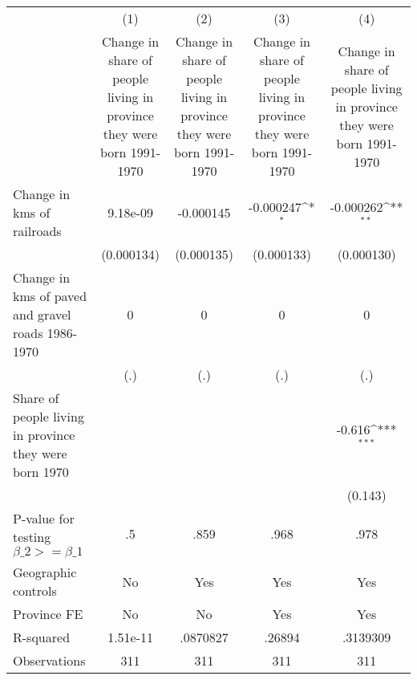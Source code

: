 {
\def\sym#1{\ifmmode^{#1}\else\(^{#1}\)\fi}
\begin{tabular}{l*{4}{c}}
\hline\hline
                &\multicolumn{1}{c}{(1)}&\multicolumn{1}{c}{(2)}&\multicolumn{1}{c}{(3)}&\multicolumn{1}{c}{(4)}\\
                &\multicolumn{1}{c}{Change in share of people living in province they were born 1991-1970}&\multicolumn{1}{c}{Change in share of people living in province they were born 1991-1970}&\multicolumn{1}{c}{Change in share of people living in province they were born 1991-1970}&\multicolumn{1}{c}{Change in share of people living in province they were born 1991-1970}\\
\hline
Change in kms of railroads& 9.18e-09         &-0.000145         &-0.000247\sym{*}  &-0.000262\sym{**} \\
                &(0.000134)         &(0.000135)         &(0.000133)         &(0.000130)         \\
[1em]
Change in kms of paved and gravel roads 1986-1970&        0         &        0         &        0         &        0         \\
                &      (.)         &      (.)         &      (.)         &      (.)         \\
[1em]
Share of people living in province they were born 1970&                  &                  &                  &   -0.616\sym{***}\\
                &                  &                  &                  &  (0.143)         \\
\hline
P-value for testing $\beta\_{2} >= \beta\_{1}$&       .5         &     .859         &     .968         &     .978         \\
Geographic controls&       No         &      Yes         &      Yes         &      Yes         \\
Province FE     &       No         &       No         &      Yes         &      Yes         \\
R-squared       & 1.51e-11         & .0870827         &   .26894         & .3139309         \\
Observations    &      311         &      311         &      311         &      311         \\
\hline\hline
\end{tabular}
}
